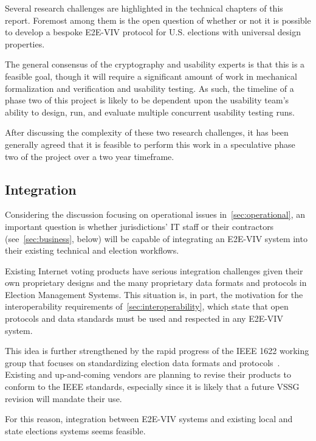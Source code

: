 Several research challenges are highlighted in the technical chapters
of this report.  Foremost among them is the open question of whether
or not it is possible to develop a bespoke E2E-VIV protocol for
U.S. elections with universal design properties.

The general consensus of the cryptography and usability experts is
that this is a feasible goal, though it will require a significant
amount of work in mechanical formalization and verification and
usability testing. As such, the timeline of a phase two of this
project is likely to be dependent upon the usability team's ability to
design, run, and evaluate multiple concurrent usability testing runs.

After discussing the complexity of these two research challenges, it
has been generally agreed that it is feasible to perform this work in
a speculative phase two of the project over a two year timeframe.

\subsection{Integration}

Considering the discussion focusing on operational issues
in~\autoref{sec:operational}, an important question is whether
jurisdictions' IT staff or their contractors
(see~\autoref{sec:business}, below) will be capable of integrating an
E2E-VIV system into their existing technical and election workflows.

Existing Internet voting products have serious integration challenges
given their own proprietary designs and the many proprietary data
formats and protocols in Election Management Systems.  This situation
is, in part, the motivation for the interoperability requirements
of~\autoref{sec:interoperability}, which state that open protocols and
data standards must be used and respected in any E2E-VIV system.

This idea is further strengthened by the rapid progress of the IEEE
1622 working group that focuses on standardizing election data formats
and protocols~\cite{IEEE1622}. Existing and up-and-coming vendors are
planning to revise their products to conform to the IEEE standards,
especially since it is likely that a future VSSG revision will mandate
their use.

For this reason, integration between E2E-VIV systems and existing
local and state elections systems seems feasible.

